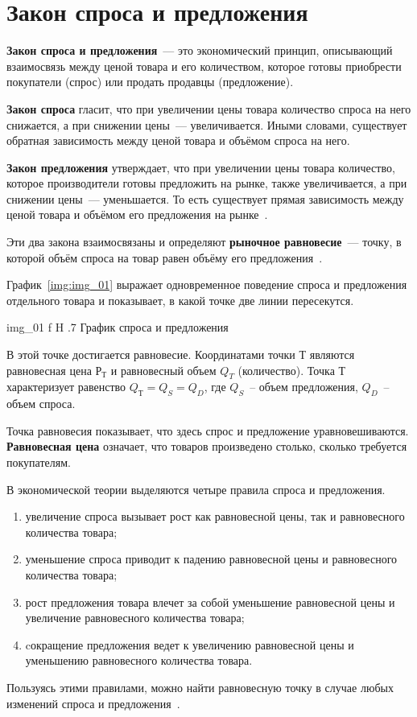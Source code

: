 \chapter{Закон спроса и предложения}

\textbf{Закон спроса и предложения}~--- это экономический принцип, описывающий взаимосвязь между ценой товара и его количеством, которое готовы приобрести покупатели (спрос) или продать продавцы (предложение).

\textbf{Закон спроса} гласит, что при увеличении цены товара количество спроса на него снижается, а при снижении цены~--- увеличивается. 
Иными словами, существует обратная зависимость между ценой товара и объёмом спроса на него.

\textbf{Закон предложения} утверждает, что при увеличении цены товара количество, которое производители готовы предложить на рынке, также увеличивается, а при снижении цены~--- уменьшается. То есть существует прямая зависимость между ценой товара и объёмом его предложения на рынке~\cite{law1}.

Эти два закона взаимосвязаны и определяют \textbf{рыночное равновесие}~--- точку, в которой объём спроса на товар равен объёму его предложения~\cite{law2}.

График~\ref{img:img_01} выражает одновременное поведение спроса и предложения отдельного товара и показывает, в какой точке две линии пересекутся. 

{img_01}
{f}
{H}
{.7\textwidth}
{График спроса и предложения~\cite{law2}}

В этой точке достигается равновесие. 
Координатами точки $Т$ являются равновесная цена $Р_{Т}$ и равновесный объем $Q_{T}$ (количество). 
Точка $Т$ характеризует равенство $Q_{Т} = Q_{S} = Q_{D}$, где $Q_{S}$~-- объем предложения, $Q_{D}$~-- объем спроса.

Точка равновесия показывает, что здесь спрос и предложение уравновешиваются. 
\textbf{Равновесная цена} означает, что товаров произведено столько, сколько требуется покупателям.

В экономической теории выделяются четыре правила спроса и предложения.
\begin{enumerate}
	\item увеличение спроса вызывает рост как равновесной цены, так и равновесного количества товара;
	\item уменьшение спроса приводит к падению равновесной цены и равновесного количества товара;
	\item рост предложения товара влечет за собой уменьшение равновесной цены и увеличение равновесного количества товара;
	\item cокращение предложения ведет к увеличению равновесной цены и уменьшению равновесного количества товара.
\end{enumerate}

Пользуясь этими правилами, можно найти равновесную точку в случае любых изменений спроса и предложения~\cite{law3}.